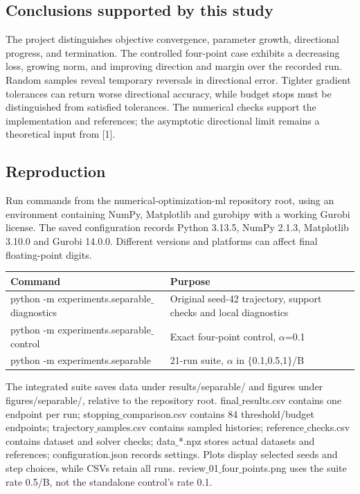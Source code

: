 \documentclass[12pt,a4paper]{article}
\begin{document}
\subsection{Conclusions supported by this study}
The project distinguishes objective convergence, parameter growth, directional progress, and termination. The controlled four-point case exhibits a decreasing loss, growing norm, and improving direction and margin over the recorded run. Random samples reveal temporary reversals in directional error. Tighter gradient tolerances can return worse directional accuracy, while budget stops must be distinguished from satisfied tolerances. The numerical checks support the implementation and references; the asymptotic directional limit remains a theoretical input from [1].

\subsection{Reproduction}
Run commands from the numerical-optimization-ml repository root, using an environment containing NumPy, Matplotlib and gurobipy with a working Gurobi license. The saved configuration records Python 3.13.5, NumPy 2.1.3, Matplotlib 3.10.0 and Gurobi 14.0.0. Different versions and platforms can affect final floating-point digits.

\begin{center}
\small
\begin{tabular}{@{}p{}p{}@{}}
\toprule
\textbf{Command} & \textbf{Purpose} \\
\midrule
python -m experiments.separable$\_$diagnostics & Original seed-42 trajectory, support checks and local diagnostics \\
python -m experiments.separable$\_$control & Exact four-point control, $\alpha$=0.1 \\
python -m experiments.separable & 21-run suite, $\alpha$ in $\{$0.1,0.5,1$\}$/B \\
\bottomrule
\end{tabular}
\end{center}
The integrated suite saves data under results/separable/ and figures under figures/separable/, relative to the repository root. final$\_$results.csv contains one endpoint per run; stopping$\_$comparison.csv contains 84 threshold/budget endpoints; trajectory$\_$samples.csv contains sampled histories; reference$\_$checks.csv contains dataset and solver checks; data$\_$*.npz stores actual datasets and references; configuration.json records settings. Plots display selected seeds and step choices, while CSVs retain all runs. review$\_$01$\_$four$\_$points.png uses the suite rate 0.5/B, not the standalone control's rate 0.1.
\end{document}

